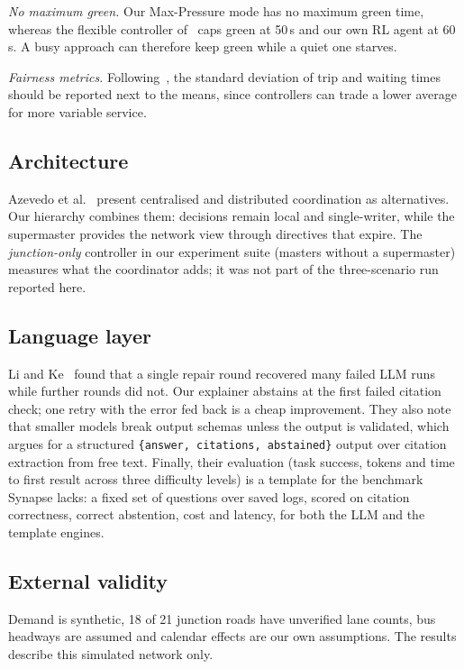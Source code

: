 \documentclass[conference]{IEEEtran}
\begin{document}
\emph{No maximum green.} Our Max-Pressure mode has no maximum green time, whereas the
flexible controller of~\cite{riehl2026sumoitscontrol} caps green at 50\,s and our own RL
agent at 60\,s. A busy approach can therefore keep green while a quiet one starves.

\emph{Fairness metrics.} Following~\cite{azevedo2016jade}, the standard deviation of trip and
waiting times should be reported next to the means, since controllers can trade a lower
average for more variable service.

\subsection{Architecture}
Azevedo et al.~\cite{azevedo2016jade} present centralised and distributed coordination as
alternatives. Our hierarchy combines them: decisions remain local and single-writer, while
the supermaster provides the network view through directives that expire. The
\emph{junction-only} controller in our experiment suite (masters without a supermaster)
measures what the coordinator adds; it was not part of the three-scenario run reported here.

\subsection{Language layer}
Li and Ke~\cite{li2026decoupled} found that a single repair round recovered many failed
LLM runs while further rounds did not. Our explainer abstains at the first failed citation
check; one retry with the error fed back is a cheap improvement. They also note that
smaller models break output schemas unless the output is validated, which argues for a
structured \texttt{\{answer, citations, abstained\}} output over citation extraction from
free text. Finally, their evaluation (task success, tokens and time to first result across
three difficulty levels) is a template for the benchmark Synapse lacks: a fixed set of
questions over saved logs, scored on citation correctness, correct abstention, cost and
latency, for both the LLM and the template engines.

\subsection{External validity}
Demand is synthetic, 18 of 21 junction roads have unverified lane counts, bus headways are
assumed and calendar effects are our own assumptions. The results describe this simulated
network only.
\end{document}
